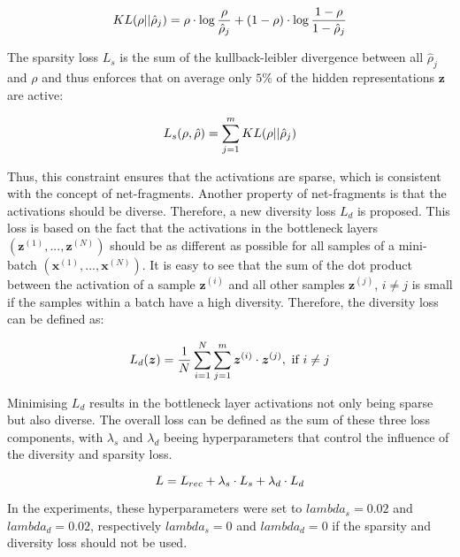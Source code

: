 \begin{equation}\eqlbl{ae_kld}
		KL(\rho || \hat{\rho}_j) = \rho \cdot \log \frac{\rho}{\hat{\rho}_j} + (1-\rho) \cdot \log \frac{1-\rho}{1-\hat{\rho}_j}
\end{equation}

The sparsity loss $L_{s}$ is the sum of the kullback-leibler divergence between all $\hat{\rho}_j$ and $\rho$ and thus enforces that on average only $5\%$ of the hidden representations $\boldsymbol{z}$ are active:

\begin{equation}\eqlbl{ae_kldl}
		L_{s}(\rho, \hat{\rho}) = \sum_{j=1}^{m} KL(\rho || \hat{\rho}_j)
\end{equation}

Thus, this constraint ensures that the activations are sparse, which is consistent with the concept of net-fragments.
Another property of net-fragments is that the activations should be diverse.
Therefore, a new diversity loss $L_{d}$ is proposed.
This loss is based on the fact that the activations in the bottleneck layers $(\boldsymbol{z}^{(1)}, ..., \boldsymbol{z}^{(N)})$ should be as different as possible for all samples of a mini-batch $(\boldsymbol{x}^{(1)}, ..., \boldsymbol{x}^{(N)})$.
It is easy to see that the sum of the dot product between the activation of a sample $\boldsymbol{z}^{(i)}$ and all other samples $\boldsymbol{z}^{(j)}$, $i \neq j$ is small if the samples within a batch have a high diversity. Therefore, the diversity loss can be defined as:

\begin{equation}\eqlbl{ae_kldl2}
		L_{d}(\boldsymbol{z}) = \frac{1}{N} \sum_{i=1}^N\sum_{j=1}^{m} \boldsymbol{z}^{(i)} \cdot \boldsymbol{z}^{(j)}, \text{ if } i\neq j
\end{equation}

Minimising $L_{d}$ results in the bottleneck layer activations not only being sparse but also diverse. 
The overall loss can be defined as the sum of these three loss components, with $\lambda_s$ and $\lambda_d$ beeing hyperparameters that control the influence of the diversity and sparsity loss.

\begin{equation}\eqlbl{ae_kldl2}
		L = L_{rec} + \lambda_s \cdot L_{s} + \lambda_d \cdot L_{d}
\end{equation}

In the experiments, these hyperparameters were set to $lambda_s = 0.02$ and $lambda_d = 0.02$, respectively $lambda_s = 0$ and $lambda_d = 0$ if the sparsity and diversity loss should not be used.

